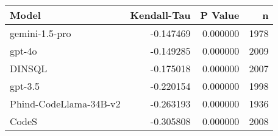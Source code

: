 \begin{tabular}{lrrr}
\toprule
Model & Kendall-Tau & P Value & n \\
\midrule
gemini-1.5-pro & -0.147469 & 0.000000 & 1978 \\
gpt-4o & -0.149285 & 0.000000 & 2009 \\
DINSQL & -0.175018 & 0.000000 & 2007 \\
gpt-3.5 & -0.220154 & 0.000000 & 1998 \\
Phind-CodeLlama-34B-v2 & -0.263193 & 0.000000 & 1936 \\
CodeS & -0.305808 & 0.000000 & 2008 \\
\bottomrule
\end{tabular}

